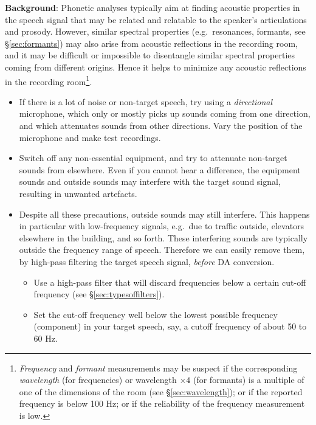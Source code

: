 \documentclass[
]{book}
\providecommand{\tightlist}{%
  \setlength{\itemsep}{0pt}\setlength{\parskip}{0pt}}
\begin{document}
\textbf{Background}: Phonetic analyses typically aim at finding acoustic properties in the speech signal that may be related and relatable to the speaker's articulations and prosody. However, similar spectral properties (e.g.~resonances, formants, see §\ref{sec:formants}) may also arise from acoustic reflections in the recording room, and it may be difficult or impossible to disentangle similar spectral properties coming from different origins. Hence it helps to minimize any acoustic reflections in the recording room\footnote{\emph{Frequency} and \emph{formant} measurements may be suspect if the corresponding \emph{wavelength} (for frequencies) or wavelength \(\times 4\) (for formants) is a multiple of one of the dimensions of the room (see §\ref{sec:wavelength}); or if the reported frequency is below 100 Hz; or if the reliability of the frequency measurement is low.}.

\begin{itemize}
\item
  If there is a lot of noise or non-target speech, try using a \emph{directional} microphone, which only or mostly picks up sounds coming from one direction, and which attenuates sounds from other directions. Vary the position of the microphone and make test recordings.
\item
  Switch off any non-essential equipment, and try to attenuate non-target sounds from elsewhere. Even if you cannot hear a difference, the equipment sounds and outside sounds may interfere with the target sound signal, resulting in unwanted artefacts.
\item
  Despite all these precautions, outside sounds may still interfere. This happens in particular with low-frequency signals, e.g.~due to traffic outside, elevators elsewhere in the building, and so forth. These interfering sounds are typically outside the frequency range of speech. Therefore we can easily remove them, by high-pass filtering the target speech signal, \emph{before} DA conversion.

  \begin{itemize}
  \tightlist
  \item
    Use a high-pass filter that will discard frequencies below a certain cut-off frequency (see §\ref{sec:typesoffilters}).
  \item
    Set the cut-off frequency well below the lowest possible frequency (component) in your target speech, say, a cutoff frequency of about 50 to 60 Hz.
  \end{itemize}
\end{itemize}
\end{document}
